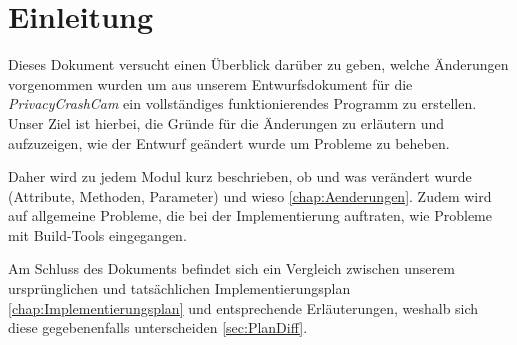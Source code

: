 \chapter{Einleitung} \label{chap:Einleitung}
Dieses Dokument versucht einen Überblick darüber zu geben, welche Änderungen vorgenommen wurden um aus unserem Entwurfsdokument für die \textit{PrivacyCrashCam} ein vollständiges funktionierendes Programm zu erstellen. Unser Ziel ist hierbei, die Gründe für die Änderungen zu erläutern und aufzuzeigen, wie der Entwurf geändert wurde um Probleme zu beheben.\par
Daher wird zu jedem Modul kurz beschrieben, ob und was verändert wurde (Attribute, Methoden, Parameter) und wieso \eqref{chap:Aenderungen}. Zudem wird auf allgemeine Probleme, die bei der Implementierung auftraten, wie Probleme mit Build-Tools eingegangen.\par
Am Schluss des Dokuments befindet sich ein Vergleich zwischen unserem ursprünglichen und tatsächlichen Implementierungsplan \eqref{chap:Implementierungsplan} und entsprechende Erläuterungen, weshalb sich diese gegebenenfalls unterscheiden \eqref{sec:PlanDiff}.